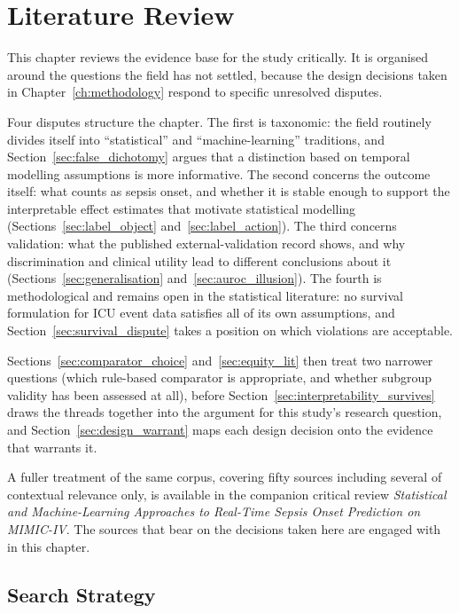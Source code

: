 \chapter{Literature Review}
\label{ch:review}

This chapter reviews the evidence base for the study critically. It is
organised around the questions the field has not settled, because the design
decisions taken in Chapter~\ref{ch:methodology} respond to specific unresolved
disputes.

Four disputes structure the chapter. The first is taxonomic: the field
routinely divides itself into ``statistical'' and ``machine-learning''
traditions, and Section~\ref{sec:false_dichotomy} argues that a distinction
based on temporal modelling assumptions is more informative. The second
concerns the outcome itself: what counts as sepsis onset, and whether it is
stable enough to support the interpretable effect estimates that motivate
statistical modelling (Sections~\ref{sec:label_object}
and~\ref{sec:label_action}). The third concerns validation: what the published
external-validation record shows, and why discrimination and clinical utility
lead to different conclusions about it (Sections~\ref{sec:generalisation}
and~\ref{sec:auroc_illusion}). The fourth is methodological and remains open in
the statistical literature: no survival formulation for ICU event data
satisfies all of its own assumptions, and Section~\ref{sec:survival_dispute}
takes a position on which violations are acceptable.

Sections~\ref{sec:comparator_choice} and~\ref{sec:equity_lit} then treat two
narrower questions (which rule-based comparator is appropriate, and
whether subgroup validity has been assessed at all), before
Section~\ref{sec:interpretability_survives} draws the threads together into the
argument for this study's research question, and
Section~\ref{sec:design_warrant} maps each design decision onto the evidence
that warrants it.

A fuller treatment of the same corpus, covering fifty sources including several
of contextual relevance only, is available in the
companion critical review \textit{Statistical and Machine-Learning Approaches
to Real-Time Sepsis Onset Prediction on MIMIC-IV}. The sources that bear on the
decisions taken here are engaged with in this chapter.


\section{Search Strategy}
\label{sec:search_strategy}

